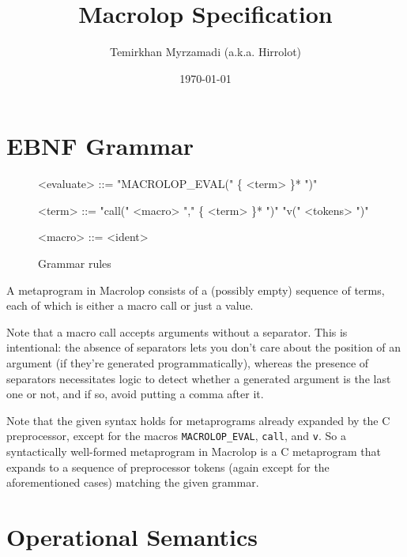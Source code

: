 \documentclass[a4paper, 12pt]{article}
\begin{document}
\title{Macrolop Specification}
\date{\today}
\author{Temirkhan Myrzamadi (a.k.a. Hirrolot)}
\maketitle

\tableofcontents

\newpage

\section{EBNF Grammar}

\begin{figure}[h]
    \caption{Grammar rules}

    \begin{grammar}
        <evaluate> ::= "MACROLOP_EVAL(" \{ <term> \}* ")"

        <term> ::= "call(" <macro> "," \{ <term> \}* ")"
            \alt "v(" <tokens> ")"

        <macro> ::= <ident>
    \end{grammar}
\end{figure}

A metaprogram in Macrolop consists of a (possibly empty) sequence of terms, each of which
is either a macro call or just a value.

Note that a macro call accepts arguments without a separator. This is intentional: the
absence of separators lets you don't care about the position of an argument (if they're
generated programmatically), whereas the presence of separators necessitates logic to
detect whether a generated argument is the last one or not, and if so, avoid putting a
comma after it.

Note that the given syntax holds for metaprograms already expanded by the C preprocessor,
except for the macros \texttt{MACROLOP_EVAL}, \texttt{call}, and \texttt{v}. So a
syntactically well-formed metaprogram in Macrolop is a C metaprogram that expands to a
sequence of preprocessor tokens (again except for the aforementioned cases) matching
the given grammar.

\section{Operational Semantics}
\end{document}
